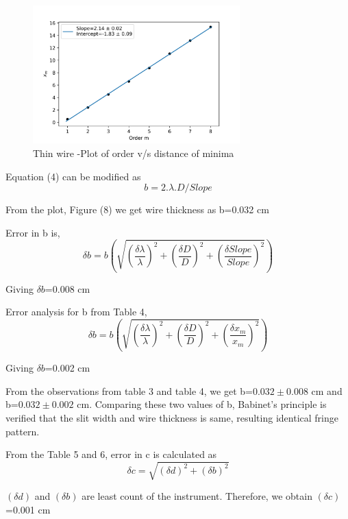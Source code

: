 \documentclass[a4paper, amsfonts, amssymb, amsmath, reprint, showkeys, nofootinbib, twoside]{revtex4-1}
\begin{document}
\begin{figure}[H] %
	\centering
	\includegraphics[width=8cm]{p2} 
	\caption{Thin wire -Plot of order v/s distance of minima}
\end{figure}

Equation (4) can be modified as
\begin{equation}
	b=2.\lambda. D/Slope
\end{equation}

From the plot, Figure (8) we get wire thickness as b=0.032 cm

Error in b is,
\begin{equation}
	\delta b=b \left(\sqrt{\left(\frac{\delta \lambda}{\lambda}\right)^2+\left(\frac{\delta D}{D}\right)^2+\left(\frac{\delta Slope}{Slope}\right)^2}\right)
\end{equation}

Giving $\delta b$=0.008 cm
 
Error analysis for b from Table 4,
\begin{equation}
	\delta b=b \left(\sqrt{\left(\frac{\delta \lambda}{\lambda}\right)^2+\left(\frac{\delta D}{D}\right)^2+\left(\frac{\delta x_m}{x_m}\right)^2}\right)
\end{equation}

Giving $\delta b$=0.002 cm

From the observations from table 3 and table 4, we get b=$0.032\pm0.008$ cm and b=$0.032\pm0.002$ cm. Comparing these two values of b, Babinet's principle is verified that the slit width and wire thickness is same, resulting identical fringe pattern.

From the Table 5 and 6, error in c is calculated as 
\begin{equation}
	\delta c=\sqrt{(\delta d)^2+(\delta b)^2}
\end{equation}

$(\delta d)$ and $(\delta b)$ are least count of the instrument. Therefore, we obtain $(\delta c)$=0.001 cm
\end{document}
